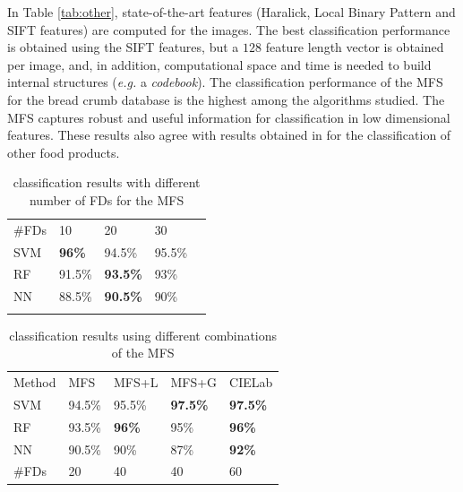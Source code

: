 \documentclass[a4paper,10pt]{article}
\begin{document}
In Table \ref{tab:other}, state-of-the-art features (Haralick, Local Binary Pattern and SIFT features) are computed for the images. The best classification performance is obtained using the SIFT features, but a $128$ feature length vector is obtained per image, and, in addition, computational space and time is needed to build internal structures ({\em e.g.} a {\em codebook}). The classification performance of the MFS for the bread crumb database is the highest among the algorithms studied. The MFS captures robust and useful information for classification in low dimensional features. These results also agree with results obtained in \cite{Bosch2011} for the classification of other food products.

\begin{table}
\caption{classification results with different number of FDs for the MFS}
\label{tab:number}       %
\begin{tabular}{lllll}
\hline\noalign{\smallskip}
\#FDs & 10  & 20 & 30 \\
\noalign{\smallskip}\hline\noalign{\smallskip}
SVM & \textbf{96\%} & 94.5\% & 95.5\% \\
RF  & 91.5\% & \textbf{93.5\%} & 93\% \\
NN & 88.5\% & \textbf{90.5\%} & 90\% \\
\noalign{\smallskip}\hline
\end{tabular}
\end{table}


\begin{table}
\caption{classification results using different combinations of the MFS}
\label{tab:mfs}       %
\begin{tabular}{lllll}
\hline\noalign{\smallskip}
Method & MFS & MFS+L & MFS+G & CIELab  \\
\noalign{\smallskip}\hline\noalign{\smallskip}
SVM & 94.5\% & 95.5\% & \textbf{97.5\%} & \textbf{97.5\%} \\
RF  & 93.5\% & \textbf{96\%} & 95\% & \textbf{96\%} \\
NN & 90.5\% & 90\% & 87\% & \textbf{92\%} \\
\noalign{\smallskip}\hline
\#FDs & 20 & 40 & 40 & 60 \\
\end{tabular}
\end{table}
\end{document}
